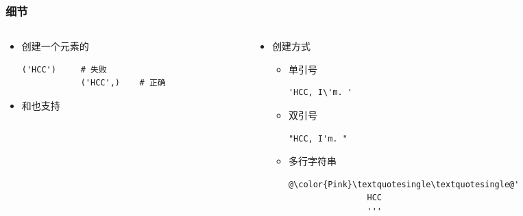 \begin{CJK}{UTF8}{gbsn}
\begin{frame} [fragile]
	\frametitle{细节}
	\linespread{1.25}
	\begin{columns}[T]
		\begin{column}[T]{.5\textwidth}
			\begin{itemize}
			\item 创建一个元素的 
			\begin{lstlisting}[style=pythonstyle, gobble=12, texcl]
			('HCC')		# 失败
			('HCC',)	# 正确
			\end{lstlisting}
			\item {}和也支持
			\end{itemize}
		\end{column}
		\begin{column}[T]{.5\textwidth}
			\begin{itemize}
			\item {}创建方式
				\begin{itemize}
				\item 单引号
				\begin{lstlisting}[style=pythonstyle, gobble=16, texcl]
				'HCC, I\'m. '
				\end{lstlisting}
				\end{itemize}
				\begin{itemize}
				\item 双引号
				\begin{lstlisting}[style=pythonstyle, gobble=16, texcl]
				"HCC, I'm. "
				\end{lstlisting}
				\end{itemize}
				\begin{itemize}
				\item 多行字符串
				\begin{lstlisting}[style=pythonstyle, gobble=16, escapechar=@]
				@\color{Pink}\textquotesingle\textquotesingle@'
				HCC
				'''
				\end{lstlisting}
				\end{itemize}
			\end{itemize}
		\end{column}
	\end{columns}
\end{frame}


\end{CJK}
